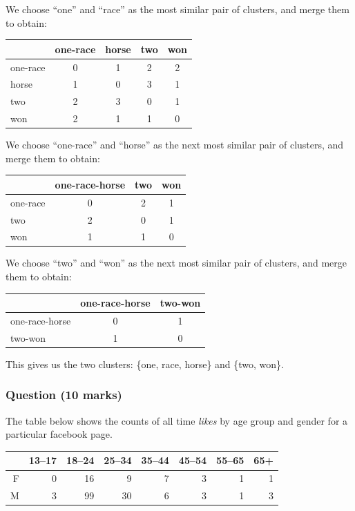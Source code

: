 \documentclass{uws_learning_guide}
\begin{document}
We choose ``one'' and ``race'' as the most similar pair of clusters, and merge them to obtain:
\begin{center}
\begin{tabular}{lcccc}
\toprule
  & one-race & horse & two & won \\
\midrule
one-race  & 0 & 1 & 2 & 2 \\
horse     & 1 & 0 & 3 & 1 \\
two       & 2 & 3 & 0 & 1 \\
won       & 2 & 1 & 1 & 0 \\
\bottomrule
\end{tabular}
\end{center}

We choose ``one-race'' and ``horse'' as the next most similar pair of clusters, and merge them to obtain:
\begin{center}
\begin{tabular}{lccc}
\toprule
  & one-race-horse & two & won \\
\midrule
one-race  & 0 & 2 & 1 \\
two       & 2 & 0 & 1 \\
won       & 1 & 1 & 0 \\
\bottomrule
\end{tabular}
\end{center}

We choose ``two'' and ``won'' as the next most similar pair of clusters, and merge them to obtain:
\begin{center}
\begin{tabular}{lcc}
\toprule
  & one-race-horse & two-won \\
\midrule
one-race-horse  & 0 & 1 \\
two-won         & 1 & 0 \\
\bottomrule
\end{tabular}
\end{center}

This gives us the two clusters: \{one, race, horse\} and \{two, won\}.

\subsubsection*{Question (10 marks)}

The table below shows the counts of all time \emph{likes} by age group and gender for a particular facebook page.

\begin{center}
\begin{tabular}{rrrrrrrr}
  \toprule
 & 13--17 & 18--24 & 25--34 & 35--44 & 45--54 & 55--65 & 65+ \\ 
  \midrule
F & 0 & 16 & 9 & 7 & 3 & 1 & 1 \\ 
  M & 3 & 99 & 30 & 6 & 3 & 1 & 3 \\ 
   \bottomrule
\end{tabular}
\end{center}
\end{document}
